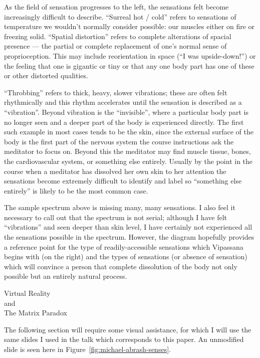 \documentclass{article}
\begin{document}
As the field of sensation progresses to the left, the sensations felt become increasingly difficult to describe. ``Surreal hot / cold'' refers to sensations of temperature we wouldn’t normally consider possible: our muscles either on fire or freezing solid. ``Spatial distortion'' refers to complete alterations of spacial presence — the partial or complete replacement of one’s normal sense of proprioception. This may include reorientation in space (``I was upside-down!'') or the feeling that one is gigantic or tiny or that any one body part has one of these or other distorted qualities.

``Throbbing'' refers to thick, heavy, slower vibrations; these are often felt rhythmically and this rhythm accelerates until the sensation is described as a ``vibration''. Beyond vibration is the ``invisible'', where a particular body part is no longer seen and a deeper part of the body is experienced directly. The first such example in most cases tends to be the skin, since the external surface of the body is the first part of the nervous system the course instructions ask the meditator to focus on. Beyond this the meditator may find muscle tissue, bones, the cardiovascular system, or something else entirely. Usually by the point in the course when a meditator has dissolved her own skin to her attention the sensations become extremely difficult to identify and label so ``something else entirely'' is likely to be the most common case.

The sample spectrum above is missing many, many sensations. I also feel it necessary to call out that the spectrum is not serial; although I have felt ``vibrations'' and seen deeper than skin level, I have certainly not experienced all the sensations possible in the spectrum. However, the diagram hopefully provides a reference point for the type of readily-accessible sensations which Vipassana begins with (on the right) and the types of sensations (or absence of sensation) which will convince a person that complete dissolution of the body not only possible but an entirely natural process.


\pagebreak

\begin{center}
  \Huge{Virtual Reality}\\
  \Huge{and}\\
  \Huge{The Matrix Paradox}
\end{center}

The following section will require some visual assistance, for which I will use the same slides I used in the talk which corresponds to this paper. An unmodified slide is seen here in Figure~\ref{fig:michael-abrash-senses}.
\end{document}

